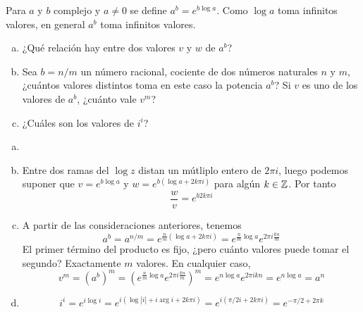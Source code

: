\documentclass[twoside]{article}
\begin{document}
\begin{ejercicio}{4}
Para $a$ y $b$ complejo y $a\neq 0$ se define $a^b = e^{b\log a}$. Como $\log a$ toma infinitos valores, en general $a^b$ toma infinitos valores.
\begin{enumerate}[(a)]
\item ¿Qué relación hay entre dos valores $v$ y $w$ de $a^b$?
\item Sea $b=n/m$ un número racional, cociente de dos números naturales $n$ y $m$, ¿cuántos valores distintos toma en este caso la potencia $a^b$? Si $v$ es uno de los valores de $a^b$, ¿cuánto vale $v^m$?
\item ¿Cuáles son los valores de $i^i$?
\end{enumerate}
\end{ejercicio}
\begin{solucion}
\begin{enumerate}[(a)]
\item[]
\item Entre dos ramas del $\log z$ distan un mútliplo entero de $2\pi i$, luego podemos suponer que $v=e^{b\log a}$ y $w = e^{b(\log a+2k\pi i)}$ para algún $k\in \mathbb{Z}$. Por tanto
$$
\frac{w}{v} = e^{b2k\pi i}
$$
\item A partir de las consideraciones anteriores, tenemos
$$
a^b=a^{n/m}=e^{\frac{n}{m}(\log a +2k\pi i)} = e^{\frac{n}{m}\log a}e^{2\pi i\frac{kn}{m}}
$$
El primer término del producto es fijo, ¿pero cuánto valores puede tomar el segundo? Exactamente $m$ valores. En cualquier caso,
$$
v^m= (a^b)^m = \left(e^{\frac{n}{m}\log a}e^{2\pi i\frac{kn}{m}}\right)^m = e^{n\log a}e^{2\pi ikn} = e^{n\log a} = a^n
$$
\item 
$$
i^i = e^{i \log i} = e^{i(\log|i|+i\arg i +2k\pi i)}=e^{i(\pi/2 i + 2k\pi i)}= e^{-\pi/2+2\pi k}
$$
\end{enumerate}
\end{solucion}
\newpage
\end{document}
